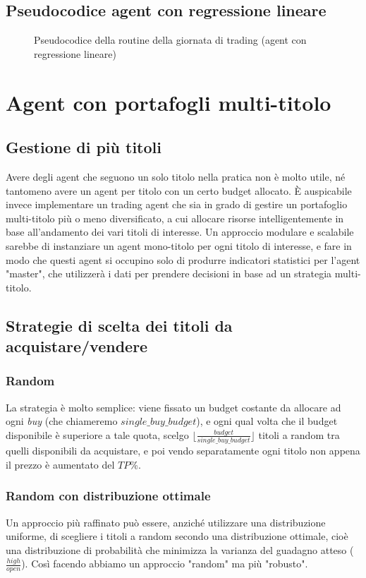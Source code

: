 \documentclass[binding=0.6cm]{sapthesis}
\begin{document}
		\section{Pseudocodice agent con regressione lineare}
			\begin{figure}[H]
			{
				\begin{codebox}
				\end{codebox}
				\caption{Pseudocodice della routine della giornata di trading (agent con regressione lineare)}
			}
			\end{figure}
	\chapter{Agent con portafogli multi-titolo}
		\section{Gestione di più titoli}
			Avere degli agent che seguono un solo titolo nella pratica non è molto utile, né tantomeno avere un agent per titolo con un certo budget allocato. È auspicabile invece implementare un trading agent
			che sia in grado di gestire un portafoglio multi-titolo più o meno diversificato, a cui allocare risorse intelligentemente in base all'andamento dei vari titoli di interesse. Un approccio modulare e
			scalabile sarebbe di instanziare un agent mono-titolo per ogni titolo di interesse, e fare in modo che questi agent si occupino solo di produrre indicatori statistici per l'agent "master", che
			utilizzerà i dati per prendere decisioni in base ad un strategia multi-titolo.
		\section{Strategie di scelta dei titoli da acquistare/vendere}
			\subsection{Random}
				La strategia è molto semplice: viene fissato un budget costante da allocare ad ogni \textit{buy} (che chiameremo $single\_buy\_budget$), e ogni qual volta che il budget disponibile è superiore a tale
				quota, scelgo $\lfloor\frac{budget}{single\_buy\_budget}\rfloor$ titoli a random tra quelli disponibili da acquistare, e poi vendo separatamente ogni titolo non appena il prezzo è aumentato del $TP$\%.
			\subsection{Random con distribuzione ottimale}
				Un approccio più raffinato può essere, anziché utilizzare una distribuzione uniforme, di scegliere i titoli a random secondo una distribuzione ottimale, cioè una distribuzione di probabilità che
				minimizza la varianza del guadagno atteso ($\frac{high}{open}$). Così facendo abbiamo un approccio "random" ma più "robusto".
\end{document}
